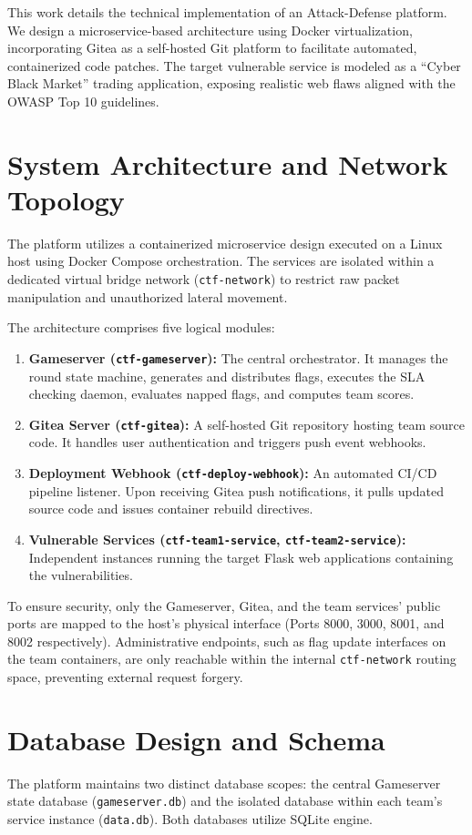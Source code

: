 \documentclass[10pt,journal,compsoc]{article}
\begin{document}
This work details the technical implementation of an Attack-Defense platform. We design a microservice-based architecture using Docker virtualization, incorporating Gitea as a self-hosted Git platform to facilitate automated, containerized code patches. The target vulnerable service is modeled as a ``Cyber Black Market'' trading application, exposing realistic web flaws aligned with the OWASP Top 10 guidelines.

\section{System Architecture and Network Topology}
The platform utilizes a containerized microservice design executed on a Linux host using Docker Compose orchestration. The services are isolated within a dedicated virtual bridge network (\texttt{ctf-network}) to restrict raw packet manipulation and unauthorized lateral movement.

The architecture comprises five logical modules:
\begin{enumerate}
    \item \textbf{Gameserver (\texttt{ctf-gameserver}):} The central orchestrator. It manages the round state machine, generates and distributes flags, executes the SLA checking daemon, evaluates napped flags, and computes team scores.
    \item \textbf{Gitea Server (\texttt{ctf-gitea}):} A self-hosted Git repository hosting team source code. It handles user authentication and triggers push event webhooks.
    \item \textbf{Deployment Webhook (\texttt{ctf-deploy-webhook}):} An automated CI/CD pipeline listener. Upon receiving Gitea push notifications, it pulls updated source code and issues container rebuild directives.
    \item \textbf{Vulnerable Services (\texttt{ctf-team1-service}, \texttt{ctf-team2-service}):} Independent instances running the target Flask web applications containing the vulnerabilities.
\end{enumerate}

To ensure security, only the Gameserver, Gitea, and the team services' public ports are mapped to the host's physical interface (Ports 8000, 3000, 8001, and 8002 respectively). Administrative endpoints, such as flag update interfaces on the team containers, are only reachable within the internal \texttt{ctf-network} routing space, preventing external request forgery.

\section{Database Design and Schema}
The platform maintains two distinct database scopes: the central Gameserver state database (\texttt{gameserver.db}) and the isolated database within each team's service instance (\texttt{data.db}). Both databases utilize SQLite engine.
\end{document}
